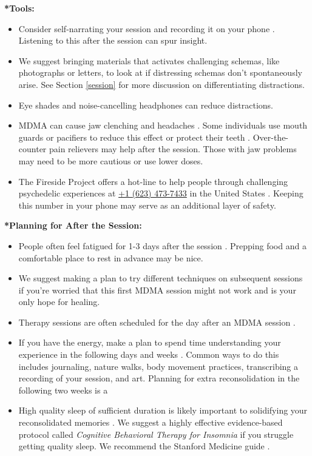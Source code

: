 \documentclass[12pt,letterpaper]{article}
\begin{document}
\noindent \textbf{*Tools:}
\begin{itemize}
    \item Consider self-narrating your session and recording it on your phone \cite{mithoeferManual}. Listening to this after the session can spur insight.
    \item We suggest bringing materials that activates challenging schemas, like photographs or letters, to look at if distressing schemas don't spontaneously arise. See Section \ref{session} for more discussion on differentiating distractions.
    \item Eye shades and noise-cancelling headphones can reduce distractions.
    \item MDMA can cause jaw clenching and headaches \cite{mitchellMDMAClinicalTrial2,liechtiGender}. Some individuals use mouth guards or pacifiers to reduce this effect or protect their teeth \cite{emdeEmergency}. Over-the-counter pain relievers may help after the session. Those with jaw problems may need to be more cautious or use lower doses. 
    \item The Fireside Project offers a hot-line to help people through challenging psychedelic experiences at \href{tel:1-623-473-7433}{+1 (623) 473-7433} in the United States \cite{firesideProject}. Keeping this number in your phone may serve as an additional layer of safety.
\end{itemize}
\noindent \textbf{*Planning for After the Session:}
\begin{itemize}
    \item People often feel fatigued for 1-3 days after the session \cite{liechtiGender}. Prepping food and a comfortable place to rest in advance may be nice.
    \item We suggest making a plan to try different techniques on subsequent sessions if you're worried that this first MDMA session might not work and is your only hope for healing.
    \item Therapy sessions are often scheduled for the day after an MDMA session \cite{mithoeferManual}. 
    \item If you have the energy, make a plan to spend time understanding your experience in the following days and weeks \cite{mithoeferManual}. Common ways to do this includes journaling, nature walks, body movement practices, transcribing a recording of your session, and art. Planning for extra reconsolidation in the following two weeks is a
    \item High quality sleep of sufficient duration is likely important to solidifying your reconsolidated memories \cite{simon2020sleep}. We suggest a highly effective evidence-based protocol called \textit{Cognitive Behavioral Therapy for Insomnia} if you struggle getting quality sleep. We recommend the Stanford Medicine guide \cite{stanfordSleep}.
\end{itemize}
\end{document}
